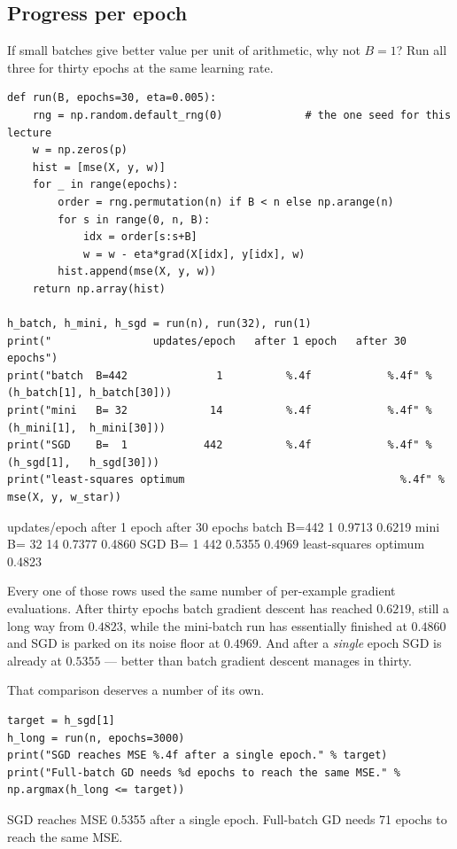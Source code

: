 \documentclass[11pt]{article}
\begin{document}
\subsection{Progress per epoch}

If small batches give better value per unit of arithmetic, why not $B=1$? Run
all three for thirty epochs at the same learning rate.

\begin{lstlisting}
def run(B, epochs=30, eta=0.005):
    rng = np.random.default_rng(0)             # the one seed for this lecture
    w = np.zeros(p)
    hist = [mse(X, y, w)]
    for _ in range(epochs):
        order = rng.permutation(n) if B < n else np.arange(n)
        for s in range(0, n, B):
            idx = order[s:s+B]
            w = w - eta*grad(X[idx], y[idx], w)
        hist.append(mse(X, y, w))
    return np.array(hist)

h_batch, h_mini, h_sgd = run(n), run(32), run(1)
print("                updates/epoch   after 1 epoch   after 30 epochs")
print("batch  B=442              1          %.4f            %.4f" % (h_batch[1], h_batch[30]))
print("mini   B= 32             14          %.4f            %.4f" % (h_mini[1],  h_mini[30]))
print("SGD    B=  1            442          %.4f            %.4f" % (h_sgd[1],   h_sgd[30]))
print("least-squares optimum                                  %.4f" % mse(X, y, w_star))
\end{lstlisting}
\begin{codeout}
                updates/epoch   after 1 epoch   after 30 epochs
batch  B=442              1          0.9713            0.6219
mini   B= 32             14          0.7377            0.4860
SGD    B=  1            442          0.5355            0.4969
least-squares optimum                                  0.4823
\end{codeout}

Every one of those rows used the same number of per-example gradient
evaluations. After thirty epochs batch gradient descent has reached $0.6219$,
still a long way from $0.4823$, while the mini-batch run has essentially
finished at $0.4860$ and SGD is parked on its noise floor at $0.4969$. And
after a \emph{single} epoch SGD is already at $0.5355$ --- better than batch
gradient descent manages in thirty.

That comparison deserves a number of its own.

\begin{lstlisting}
target = h_sgd[1]
h_long = run(n, epochs=3000)
print("SGD reaches MSE %.4f after a single epoch." % target)
print("Full-batch GD needs %d epochs to reach the same MSE." % np.argmax(h_long <= target))
\end{lstlisting}
\begin{codeout}
SGD reaches MSE 0.5355 after a single epoch.
Full-batch GD needs 71 epochs to reach the same MSE.
\end{codeout}
\end{document}
